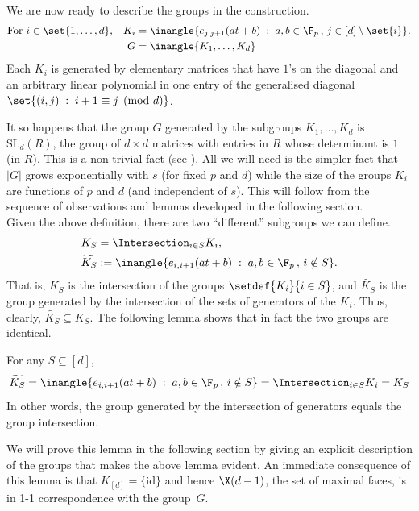 \documentclass{toc}
\begin{document}
\noindent
We are now ready to describe the groups in the construction.
\begin{align*}
  \text{For $i\in \set{1,\ldots, d}$,}\quad K_i & = \inangle{e_{j,j+1}(at + b)\;:\; a,b \in \F_p\,,\,j \in [d] \setminus \set{i}}.\\
  G & = \inangle{K_1,\ldots, K_d}
\end{align*}
Each $K_i$ is generated by elementary matrices that have $1$'s on the
diagonal and an arbitrary linear polynomial in one entry of the
generalised diagonal %
$\set{(i,j)\;:\; i+1\equiv j \pmod d}$.  %

It so happens that the group $G$ generated by the subgroups
$K_1, \ldots, K_d$ is $\mathrm{SL}_d(R)$, the group of $d\times d$
matrices with entries in $R$ whose determinant is $1$ (in $R$). This
%
is a non-trivial fact %
(see  %
\cite[Theorem 4.3.9]{HM89}).   %
All we will need is the simpler fact that $|G|$
grows exponentially with $s$ (for fixed $p$ and $d$) while the size of
the groups $K_i$ are functions of $p$ and $d$ (and independent of
$s$). This will follow from the sequence of observations and lemmas
developed in the following section.\\

\noindent Given the above definition, there are two ``different''
subgroups we can define. 
\begin{align*}
K_S & = \Intersection_{i\in S} K_i,\\
\widetilde{K_S} &:= \inangle{e_{i,i+1}(at+b)\;:\; a,b\in \F_p\,,\, i\notin S}.
\end{align*}
That is, $K_S$ is the intersection of the groups $\setdef{K_i}{i\in S}$, and
$\widetilde{K_S}$ is the group generated by the intersection of the
sets of %
generators of the
%
$K_i$.  %
Thus, clearly, $\widetilde{K_S} \subseteq K_S$. The following lemma shows that
in fact the two groups are identical. 


\begin{lemma}[Intersections of $K_i$'s]\label{lem:intersection-property-KS}
  For any $S \subseteq [d]$,
  \[
   \widetilde{K_{S}} = \inangle{e_{i,i+1}(at +b)\;:\; a,b\in \F_p\,,\, i\notin S}
    = \Intersection_{i\in S} K_i = K_S
  \]
  In other words, the group generated by the intersection of generators equals the group intersection. 
\end{lemma}

We will prove this lemma in the following section by giving an
explicit description of the groups that makes the above lemma
evident. An immediate consequence of this lemma is that $K_{[d]} =
\{\mathrm{id}\}$ and hence $\X(d-1)$, the set of maximal faces, is in
1-1 correspondence with the group~$G$.   %
\end{document}

